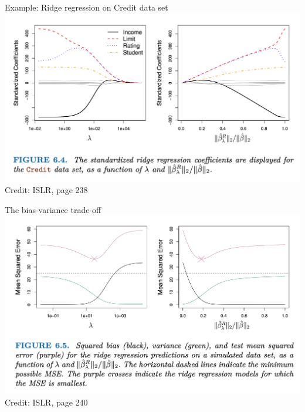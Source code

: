 \documentclass{beamer}
\begin{document}
  \begin{frame}{Example: Ridge regression on Credit data set}
    \includegraphics[width = \textwidth]{images/ridge_credit.png}
    \vfill
    \hfill \footnotesize Credit: ISLR, page 238
  \end{frame}

  \begin{frame}{The bias-variance trade-off}
    \includegraphics[width = \textwidth]{images/bias_variance.png}
    \vfill
    \hfill \footnotesize Credit: ISLR, page 240
  \end{frame}
\end{document}
